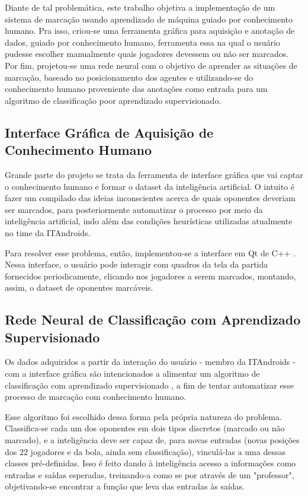\documentclass[10pt,fleqn,a4paper]{article}
\begin{document}
    Diante de tal problemática, este trabalho objetiva a implementação de um sistema de marcação usando aprendizado de máquina guiado por conhecimento humano. Pra isso, criou-se uma ferramenta gráfica para aquisição e anotação de dados, guiado por conhecimento humano, ferramenta essa na qual o usuário pudesse escolher manualmente quais jogadores devessem ou não ser marcados. Por fim, projetou-se uma rede neural com o objetivo de aprender as situações de marcação, baseado no posicionamento dos agentes e utilizando-se do conhecimento humano proveniente das anotações como entrada para um algoritmo de classificação poor aprendizado supervisionado.
    
    \subsection{Interface Gráfica de Aquisição de Conhecimento Humano}
    
    Grande parte do projeto se trata da ferramenta de interface gráfica que vai captar o conhecimento humano e formar o dataset da inteligência artificial. O intuito é fazer um compilado das ideias inconscientes acerca de quais oponentes deveriam ser marcados, para posteriormente automatizar o processo por meio da inteligência artificial, indo além das condições heurísticas utilizadas atualmente no time da ITAndroids. 
    
    Para resolver esse problema, então, implementou-se a interface em Qt de C++ \citep{qtdoc}. Nessa interface, o usuário pode interagir com quadros da tela da partida fornecidos periodicamente, clicando nos jogadores a serem marcados, montando, assim, o dataset de oponentes marcáveis.
    
    \subsection{Rede Neural de Classificação com Aprendizado Supervisionado}
    
    Os dados adquiridos a partir da interação do usuário - membro da ITAndroids - com a interface gráfica são intencionados a alimentar um algoritmo de classificação com aprendizado supervisionado \citep{kotsiantis2007supervised}, a fim de tentar automatizar esse processo de marcação com conhecimento humano. 
    
    Esse algoritmo foi escolhido dessa forma pela própria natureza do problema. Classifica-se cada um dos oponentes em dois tipos discretos (marcado ou não marcado), e a inteligência deve ser capaz de, para novas entradas (novas posições dos 22 jogadores e da bola, ainda sem classificação), vinculá-las a uma dessas classes pré-definidas. Isso é feito dando à inteligência acesso a informações como entradas e saídas esperadas, treinando-a como se por através de um "professor", objetivando-se encontrar a função que leva das entradas às saídas.
    
\end{document}
